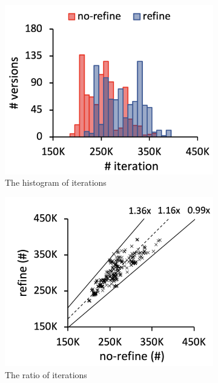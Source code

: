 \begin{figure}
  \centering
  \begin{subfigure}[b]{0.24\textwidth}
    \includegraphics[width=\textwidth]{img/compare-iter}
    \caption{The histogram of iterations}
  \end{subfigure}
  \begin{subfigure}[b]{0.24\textwidth}
    \includegraphics[width=\textwidth]{img/ratio-iter}
    \caption{The ratio of iterations}
  \end{subfigure}
  \begin{subfigure}[b]{0.24\textwidth}

\end{subfigure}
\end{figure}

